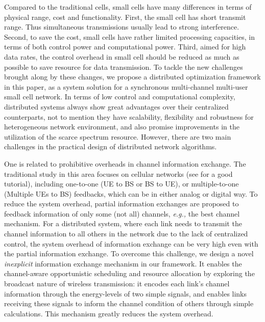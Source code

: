 \documentclass[conference]{IEEEtran}
\newcommand{\eg}{\emph{e.g., }}
\begin{document}
Compared to the traditional cells, small cells have many differences in terms of physical range, cost and functionality. First, the small cell has short transmit range. Thus simultaneous transmissions usually lead to strong interference. Second, to save the cost, small cells have rather limited processing capacities, in terms of both control power and computational power. Third, aimed for high data rates, the control overhead in small cell should be reduced as much as possible to save resource for data transmission.
To tackle the new challenges brought along by these changes,
we propose a distributed optimization framework in this paper, as a system solution for a synchronous multi-channel multi-user small cell network.
In terms of low control and computational complexity, distributed systems always show great advantages over their centralized counterparts, not to mention they have scalability, flexibility and robustness for heterogeneous network environment, and also promise improvements in the utilization of the scarce spectrum resource. However, there are two main challenges in the practical design of distributed network algorithms.

One is related to prohibitive overheads in channel information exchange. The traditional study in this area focuses on cellular networks (see \cite{love2008overview} for a good tutorial), including one-to-one (UE to BS or BS to UE), or multiple-to-one (Multiple UEs to BS) feedbacks, which can be in either analog or digital way. To reduce the system overhead, partial information exchanges\cite{love2008overview,Huang2012sum,Huang2013analytical} are proposed to feedback information of only some (not all) channels, \eg the best  channel mechanism. For a distributed system, where each link needs to transmit the channel information to all others in the network due to the lack of centralized control, the system overhead of information exchange can be very high even with the partial information exchange. To overcome this challenge, we design a novel \emph{inexplicit} information exchange mechanism in our framework. It enables the channel-aware opportunistic scheduling and resource allocation by exploring the broadcast nature of wireless transmission: it encodes each link's channel information through the energy-levels of two simple signals, and enables links receiving these signals to inform the channel condition of others through simple calculations. This mechanism greatly reduces the system overhead.
\end{document}
